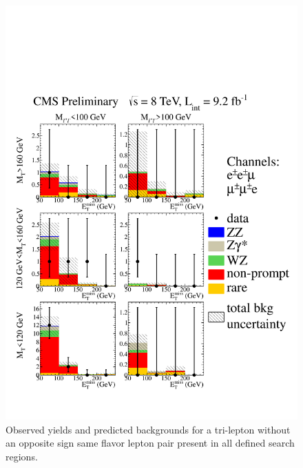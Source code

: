 \begin{figure}[htp]
\begin{center}
\includegraphics[width=1.0\textwidth]{plots/3lfinal/ossf0tau0.pdf}
\caption{Observed yields and predicted backgrounds for a tri-lepton without an opposite sign same flavor 
lepton pair present in all defined search regions.}
\label{fig:OSSF0tau0}
\end{center}
\end{figure}
